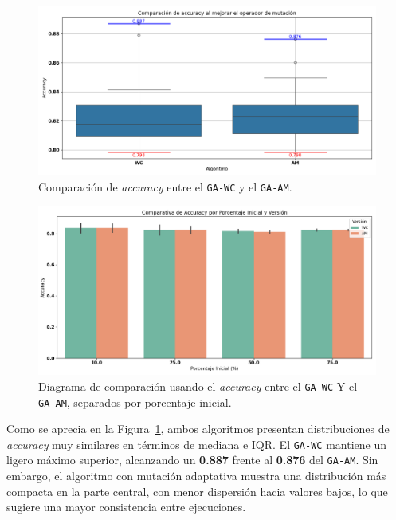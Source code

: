\begin{figure}[htp]
  \centering
  \includegraphics[width=1\textwidth]{imagenes/evaluaciones/mutacion-adaptativa.png}
  \caption{Comparación de \textit{accuracy} entre el \texttt{GA-WC} y el \texttt{GA-AM}.}
  \label{fig:mutacion-adaptativa}
\end{figure}

\begin{figure}[htp]
  \centering
  \includegraphics[width=1\textwidth]{imagenes/evaluaciones/mutacion-adaptativa_por_porcentaje.png}
  \caption{Diagrama de comparación usando el \textit{accuracy} entre el \texttt{GA-WC} Y el \texttt{GA-AM}, separados por porcentaje inicial.}
  \label{fig:mutacion-adaptativa-porcentaje}
\end{figure}

Como se aprecia en la Figura~\ref{fig:mutacion-adaptativa},
ambos algoritmos presentan distribuciones de \textit{accuracy} muy similares en términos de mediana e IQR.
El \texttt{GA-WC} mantiene un ligero máximo superior, alcanzando un \textbf{0.887} frente al \textbf{0.876} del \texttt{GA-AM}.
Sin embargo, el algoritmo con mutación adaptativa muestra una distribución más compacta en la parte central,
con menor dispersión hacia valores bajos, lo que sugiere una mayor consistencia entre ejecuciones.

